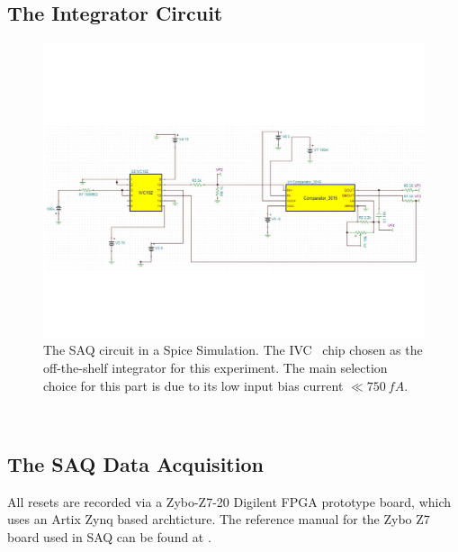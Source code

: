\subsection{The Integrator Circuit}



\begin{figure}[]
\centering
\includegraphics[width=\textwidth]{images/SAQ_spice_circuit.pdf}
\caption{The SAQ circuit in a Spice Simulation. The IVC~\citep{ivc_datasheet} chip chosen as the off-the-shelf integrator for this experiment. The main selection choice for this part is due to its low input bias current $\ll 750~\unit{fA}$.}
\end{figure}~\label{fig:saq_circuit_spice}


\subsection{The SAQ Data Acquisition}

All resets are recorded via a Zybo-Z7-20 Digilent FPGA prototype board, which uses an Artix Zynq based archticture.
The reference manual for the Zybo Z7 board used in SAQ can be found at \citep{zybo_zy_reference}.

